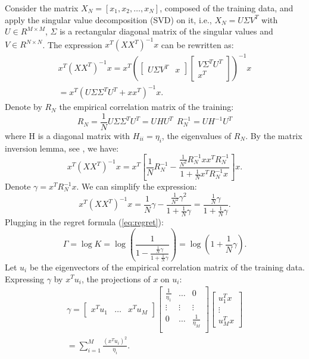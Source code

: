 \documentclass[conference,letterpaper]{IEEEtran}
\begin{document}
Consider the matrix $X_N = [x_1,x_2, \hdots, x_{N}]$, composed of the training data, and apply the singular value decomposition (SVD) on it, i.e., $X_N = U \Sigma V^T$ with $U\in R^{M \times M}$, 
$\Sigma$ is a rectangular diagonal matrix of the singular values and $V \in R^{N \times N}$. 
The expression $x^T(XX^T)^{-1}x$ can be rewritten as:
\begin{multline}
x^T(XX^T)^{-1}x = 
x^T\left(\begin{bmatrix} U \Sigma V^T & x \end{bmatrix}
\begin{bmatrix}
V \Sigma^T U^T \\ x^T
\end{bmatrix}
\right)^{-1}x \\
=  x^T\left(U \Sigma \Sigma^T U^T + x x^T\right)^{-1}x.
\end{multline}
Denote by $R_N$ the empirical correlation matrix of the training: 
\begin{equation}
R_N=\frac{1}{N} U \Sigma \Sigma^T U^T=U H U^T \ \ R_N^{-1}=  U H^{-1} U^T   
\end{equation}
where H is a diagonal matrix with $H_{ii}=\eta_i$, the eigenvalues of $R_N$.
By the matrix inversion lemma, see \cite{press2007section}, 
we have:
\begin{equation}
x^T(XX^T)^{-1}x = 
x^T \left[ \frac{1}{N}R_N^{-1} -  \frac{\frac{1}{N^2}R_N^{-1} x x^T  R_N^{-1}}{1 + \frac{1}{N} x^T  R_N^{-1} x} \right] x.
\end{equation}
Denote $\gamma = x^T R_N^{-1} x$. We can simplify the expression:
\begin{equation}
x^T(XX^T)^{-1}x = \frac{1}{N}\gamma - \frac{\frac{1}{N^2}\gamma^2}{1+\frac{1}{N}\gamma} = \frac{\frac{1}{N}\gamma}{1+\frac{1}{N}\gamma}.
\end{equation}
Plugging in the regret formula (\ref{eq:regret}):
\begin{equation}
\Gamma = \log K = \log \left( \frac{1}{1-\frac{\frac{1}{N}\gamma}{1+\frac{1}{N}\gamma}} \right)
=  \log \left( 1+\frac{1}{N} \gamma \right).
\end{equation}
Let $u_i$ be the eigenvectors of the empirical correlation matrix of the training data. 
Expressing $\gamma$ by $x^Tu_i$, the projections of $x$ on $u_i$:
\begin{multline}
\gamma = 
\begin{bmatrix}
x^T u_1 & \hdots & x^T u_M
\end{bmatrix}
\begin{bmatrix}
\frac{1}{\eta_1} & \hdots & 0 \\
\vdots & \vdots &  \vdots \\
0 & \hdots &  \frac{1}{\eta_M} \\
\end{bmatrix}
\begin{bmatrix}
u_1^T x \\ \vdots \\ u_M^T x
\end{bmatrix} \\
= \sum_{i=1}^{M} \frac{\left(x^Tu_i\right)^2}{\eta_i}.
\end{multline}
\end{document}
